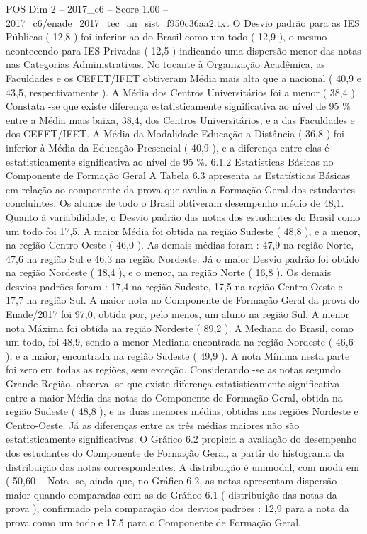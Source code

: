 \begin{textsample}{POS Dim 2 – 2017\_c6 – Score 1.00 – 2017\_c6/enade\_2017\_tec\_an\_sist\_f950c36aa2.txt}
O Desvio padrão para as IES Públicas ( 12,8 ) foi inferior ao do Brasil como um todo ( 12,9 ), o mesmo acontecendo para IES Privadas ( 12,5 ) indicando uma dispersão menor das notas nas Categorias Administrativas.
No tocante à Organização Acadêmica, as Faculdades e os CEFET/IFET obtiveram Média mais alta que a nacional ( 40,9 e 43,5, respectivamente ).
A Média dos Centros Universitários foi a menor ( 38,4 ).
Constata -se que existe diferença estatisticamente significativa ao nível de 95 \% entre a Média mais baixa, 38,4, dos Centros Universitários, e a das Faculdades e dos CEFET/IFET.
A Média da Modalidade Educação a Distância ( 36,8 ) foi inferior à Média da Educação Presencial ( 40,9 ), e a diferença entre elas é estatisticamente significativa ao nível de 95 \%. 6.1.2 Estatísticas Básicas no Componente de Formação Geral A Tabela 6.3 apresenta as Estatísticas Básicas em relação ao componente da prova que avalia a Formação Geral dos estudantes concluintes.
Os alunos de todo o Brasil obtiveram desempenho médio de 48,1.
Quanto à variabilidade, o Desvio padrão das notas dos estudantes do Brasil como um todo foi 17,5.
A maior Média foi obtida na região Sudeste ( 48,8 ), e a menor, na região Centro-Oeste ( 46,0 ).
As demais médias foram : 47,9 na região Norte, 47,6 na região Sul e 46,3 na região Nordeste.
Já o maior Desvio padrão foi obtido na região Nordeste ( 18,4 ), e o menor, na região Norte ( 16,8 ).
Os demais desvios padrões foram : 17,4 na região Sudeste, 17,5 na região Centro-Oeste e 17,7 na região Sul.
A maior nota no Componente de Formação Geral da prova do Enade/2017 foi 97,0, obtida por, pelo menos, um aluno na região Sul.
A menor nota Máxima foi obtida na região Nordeste ( 89,2 ).
A Mediana do Brasil, como um todo, foi 48,9, sendo a menor Mediana encontrada na região Nordeste ( 46,6 ), e a maior, encontrada na região Sudeste ( 49,9 ).
A nota Mínima nesta parte foi zero em todas as regiões, sem exceção.
Considerando -se as notas segundo Grande Região, observa -se que existe diferença estatisticamente significativa entre a maior Média das notas do Componente de Formação Geral, obtida na região Sudeste ( 48,8 ), e as duas menores médias, obtidas nas regiões Nordeste e Centro-Oeste.
Já as diferenças entre as três médias maiores não são estatisticamente significativas.
O Gráfico 6.2 propicia a avaliação do desempenho dos estudantes do Componente de Formação Geral, a partir do histograma da distribuição das notas correspondentes.
A distribuição é unimodal, com moda em ( 50,60 ].
Nota -se, ainda que, no Gráfico 6.2, as notas apresentam dispersão maior quando comparadas com as do Gráfico 6.1 ( distribuição das notas da prova ), confirmado pela comparação dos desvios padrões : 12,9 para a nota da prova como um todo e 17,5 para o Componente de Formação Geral.

\end{textsample}
